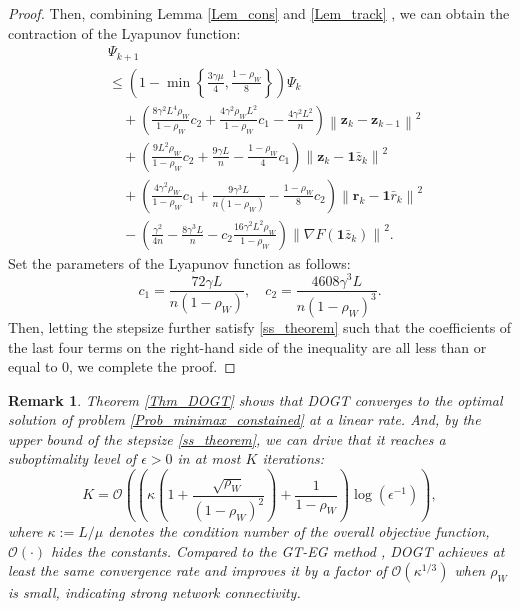 \documentclass[letterpaper, 10 pt, conference]{ieeeconf}
\newtheorem{Rem}{Remark}
\begin{document}
\begin{proof}
Then, combining Lemma \ref{Lem_cons} and \ref{Lem_track} , we can obtain the contraction of the Lyapunov function:
\begin{equation}
\begin{aligned}
&\varPsi _{k+1}
\\
&\leqslant \left( 1-\min \left\{ \frac{3\gamma \mu}{4}, \frac{1-\rho _W}{8} \right\} \right) \varPsi _{k}
\\
&\quad+\left( \frac{8\gamma ^2L^4\rho _W}{1-\rho _W}c_2+\frac{4\gamma ^2\rho _WL^2}{1-\rho _W}c_1-\frac{4\gamma ^2L^2}{n} \right) \left\| \mathbf{z}_k-\mathbf{z}_{k-1} \right\| ^2
\\
&\quad+\left( \frac{9L^2\rho _W}{1-\rho _W}c_2+\frac{9\gamma L}{n}-\frac{1-\rho _W}{4}c_1 \right) \left\| \mathbf{z}_k-\mathbf{1}\bar{z}_k \right\| ^2
\\
&\quad+\left( \frac{4\gamma ^2\rho _W}{1-\rho _W}c_1+\frac{9\gamma ^3L}{n\left( 1-\rho _W \right)}-\frac{1-\rho _W}{8}c_2 \right) \left\| \mathbf{r}_k-\mathbf{1}\bar{r}_k \right\| ^2
\\
&\quad-\left( \frac{\gamma ^2}{4n}-\frac{8\gamma ^3L}{n}-c_2\frac{16\gamma ^2L^2\rho _W}{1-\rho _W} \right) \left\| \nabla F\left( \mathbf{1}\bar{z}_k \right) \right\| ^2.
\end{aligned}
\end{equation}
Set the parameters of the Lyapunov function as follows:
\begin{equation}
c_1=\frac{72\gamma L}{n\left( 1-\rho _W \right)},  \quad
c_2=\frac{4608\gamma ^3L}{n\left( 1-\rho _W \right) ^3}.
\end{equation}
Then, letting the stepsize further satisfy \eqref{ss_theorem} such that the coefficients of the last four terms on the right-hand side of the inequality are all less than or equal to 0, we complete the proof.
\end{proof}


\begin{Rem}
Theorem \ref{Thm_DOGT} shows that DOGT converges to the optimal solution of problem \eqref{Prob_minimax_constained} at a linear rate. And, by the upper bound of the stepsize \eqref{ss_theorem}, we can drive that it reaches a suboptimality level of $\epsilon > 0$ in at most $K$ iterations:
\begin{equation}\label{Eq_iter_complexity_DOGT}
K=\mathcal{O} \left( \left( \kappa \left( 1+\frac{\sqrt{\rho _W}}{\left( 1-\rho _W \right) ^2} \right) +\frac{1}{1-\rho _W} \right) \log \left( \epsilon ^{-1} \right) \right),
\end{equation}
where $\kappa:=L/\mu$ denotes the condition number of the overall objective function, $\mathcal{O} \left( \cdot \right) $ hides the constants. Compared to the GT-EG method \cite{mukherjee2020decentralized}, DOGT achieves at least the same convergence rate and improves it by a factor of $\mathcal{O} \left( \kappa ^{1/3} \right)$ when $\rho_W$ is small, indicating strong network connectivity. 
\end{Rem}
\end{document}
